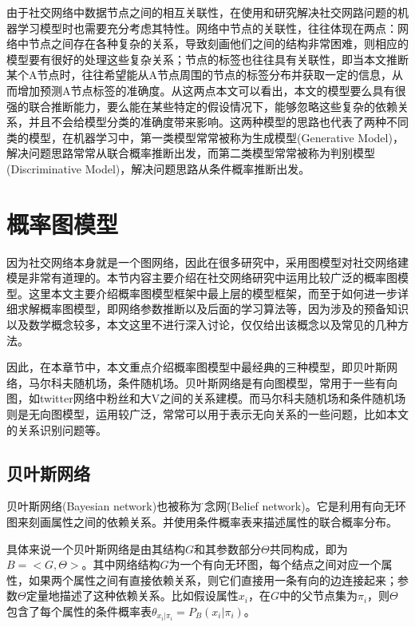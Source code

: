 由于社交网络中数据节点之间的相互关联性，在使用和研究解决社交网路问题的机器学习模型时也需要充分考虑其特性。网络中节点的关联性，往往体现在两点：网络中节点之间存在各种复杂的关系，导致刻画他们之间的结构非常困难，则相应的模型要有很好的处理这些复杂关系；节点的标签也往往具有关联性，即当本文推断某个A节点时，往往希望能从A节点周围的节点的标签分布并获取一定的信息，从而增加预测A节点标签的准确度。从这两点本文可以看出，本文的模型要么具有很强的联合推断能力，要么能在某些特定的假设情况下，能够忽略这些复杂的依赖关系，并且不会给模型分类的准确度带来影响。这两种模型的思路也代表了两种不同类的模型，在机器学习中，第一类模型常常被称为生成模型(Generative Model)，解决问题思路常常从联合概率推断出发，而第二类模型常常被称为判别模型(Discriminative Model)，解决问题思路从条件概率推断出发。

\section{概率图模型}

因为社交网络本身就是一个图网络，因此在很多研究中，采用图模型对社交网络建模是非常有道理的。本节内容主要介绍在社交网络研究中运用比较广泛的概率图模型。这里本文主要介绍概率图模型框架中最上层的模型框架，而至于如何进一步详细求解概率图模型，即网络参数推断以及后面的学习算法等，因为涉及的预备知识以及数学概念较多，本文这里不进行深入讨论，仅仅给出该概念以及常见的几种方法。

因此，在本章节中，本文重点介绍概率图模型中最经典的三种模型，即贝叶斯网络，马尔科夫随机场，条件随机场。贝叶斯网络是有向图模型，常用于一些有向图，如twitter网络中粉丝和大V之间的关系建模。而马尔科夫随机场和条件随机场则是无向图模型，运用较广泛，常常可以用于表示无向关系的一些问题，比如本文的关系识别问题等。


\subsection{贝叶斯网络}

贝叶斯网络(Bayesian network)也被称为\"信念网\"(Belief network)。它是利用有向无环图来刻画属性之间的依赖关系。并使用条件概率表来描述属性的联合概率分布。

具体来说一个贝叶斯网络是由其结构$G$和其参数部分$\Theta$共同构成，即为$B = <G,\Theta >$。其中网络结构$G$为一个有向无环图，每个结点之间对应一个属性，如果两个属性之间有直接依赖关系，则它们直接用一条有向的边连接起来；参数$\Theta$定量地描述了这种依赖关系。比如假设属性$x_i$，在$G$中的父节点集为$\pi_i$，则$\Theta$包含了每个属性的条件概率表$\theta_{x_i|\pi_i}= P_B(x_i|\pi_i)$。

